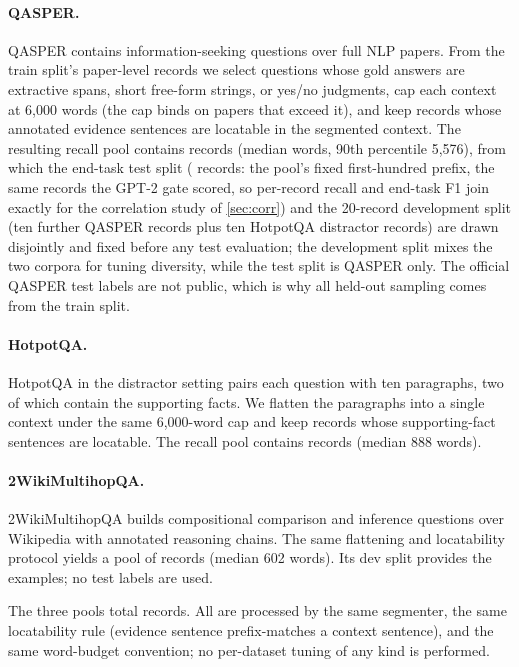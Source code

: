 \documentclass[preprint,12pt]{elsarticle}
\theoremstyle{remark}
\begin{document}
\paragraph{QASPER.}
QASPER \citep{dasigi2021qasper} contains information-seeking questions
over full NLP papers. From the train split's paper-level records we
select questions whose gold answers are extractive spans, short
free-form strings, or yes/no judgments, cap each context at 6{,}000
words (the cap binds on papers that exceed it), and keep records whose
annotated evidence sentences are locatable in the segmented context.
The resulting recall pool contains \NRecQ{} records (median
\PoolQMedWords{} words, 90th percentile 5{,}576), from which the
end-task test split (\QAN{} records: the pool's fixed first-hundred
prefix, the same records the GPT-2 gate scored, so per-record recall
and end-task F1 join exactly for the correlation study of
\autoref{sec:corr}) and the 20-record development split (ten further
QASPER records plus ten HotpotQA distractor records) are drawn
disjointly and fixed before any test evaluation; the development split
mixes the two corpora for tuning diversity, while the test split is
QASPER only. The official QASPER test labels are not public, which is
why all held-out sampling comes from the train split.

\paragraph{HotpotQA.}
HotpotQA \citep{yang2018hotpotqa} in the distractor setting pairs each
question with ten paragraphs, two of which contain the supporting
facts. We flatten the paragraphs into a single context under the same
6{,}000-word cap and keep records whose supporting-fact sentences are
locatable. The recall pool contains \NRecH{} records (median 888
words).

\paragraph{2WikiMultihopQA.}
2WikiMultihopQA \citep{ho2020wiki} builds compositional comparison and
inference questions over Wikipedia with annotated reasoning chains.
The same flattening and locatability protocol yields a pool of
\NRecW{} records (median 602 words). Its dev split provides the
examples; no test labels are used.

The three pools total \TotalRecords{} records. All are processed by
the same segmenter, the same locatability rule (evidence sentence
prefix-matches a context sentence), and the same word-budget
convention; no per-dataset tuning of any kind is performed.
\end{document}
